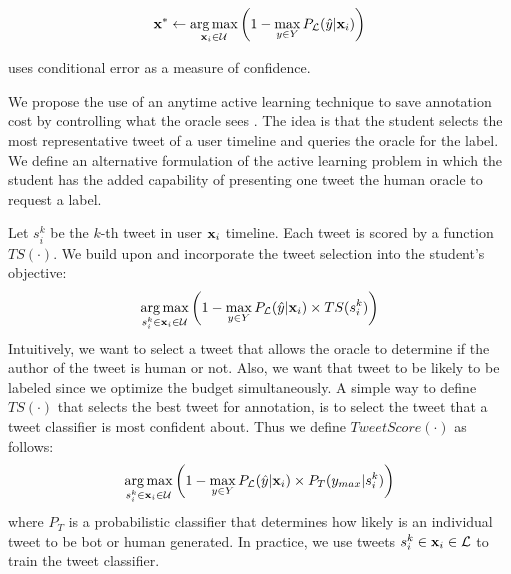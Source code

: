 \begin{equation}\label{eq:unc}
 {\mathbf x}^* \leftarrow \operatorname*{arg\,max}_{{\mathbf x}_i \in {\mathcal{U}}} \left(1- \max_{y \in Y} P_{{\mathcal{L}}}(\hat{y}|{\mathbf x}_i) \right)	
\end{equation}

 uses conditional error as a measure of confidence.

%
We propose the use of an anytime active learning technique to save annotation cost by controlling what the oracle sees \cite{ramirez:aaai14}. The idea is that the student selects the most representative tweet of a user timeline and queries the oracle for the label. We define an alternative formulation of the active learning problem in which the student has the added capability of presenting one tweet the human oracle to request a label. 

Let $s_i^k$ be the $k$-th tweet in user ${\mathbf x}_i$ timeline. Each tweet is scored by a function $TS(\cdot)$. We build upon  and incorporate the tweet selection into the student's objective:
%
\begin{multline} \label{eq:obj}
    \operatorname*{arg\,max}_{s_i^k \in {\mathbf x}_i \in {\mathcal{U}}} \left(1- \max_{y \in Y} P_{{\mathcal{L}}}(\hat{y}|{\mathbf x}_i) \times TS(s_i^k) \right)
\end{multline}
%
Intuitively, we want to select a tweet that allows the oracle to determine if the author of the tweet is human or not. Also, we want that tweet to be likely to be labeled since we optimize the budget simultaneously. A simple way to define $TS(\cdot)$ that selects the best tweet for annotation, is to select the tweet that a tweet classifier is most confident about. Thus we define $TweetScore(\cdot)$ as follows:
%
\begin{multline}\label{eq:score}
 \operatorname*{arg\,max}_{s_i^k \in {\mathbf x}_i \in {\mathcal{U}}} \left(1- \max_{y \in Y} P_{{\mathcal{L}}}(\hat{y}|{\mathbf x}_i) \times P_T(y_{max} | s_i^k) \right)	
\end{multline}
\noindent
where $P_T$ is a probabilistic classifier that determines how likely is an individual tweet to be bot or human generated. In practice, we use tweets $s_i^k \in {\mathbf x}_i \in {\mathcal{L}}$ to train the tweet classifier.  
  
